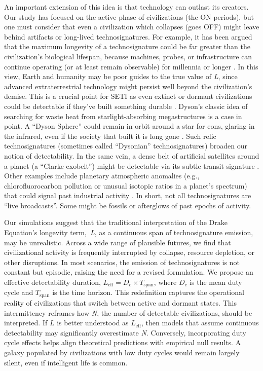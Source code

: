 An important extension of this idea is that technology can outlast its creators. Our study has focused on the active phase of civilizations (the ON periods), but one must consider that even a civilization which collapses (goes OFF) might leave behind artifacts or long-lived technosignatures. For example, it has been argued that the maximum longevity of a technosignature could be far greater than the civilization's biological lifespan, because machines, probes, or infrastructure can continue operating (or at least remain observable) for millennia or longer \citep{Wright2022-wh}. In this view, Earth and humanity may be poor guides to the true value of \emph{L}, since advanced extraterrestrial technology might persist well beyond the civilization's demise. This is a crucial point for SETI as even extinct or dormant civilizations could be detectable if they've built something durable \citep{Cirkovic2019-oq}. Dyson's classic idea of searching for waste heat from starlight-absorbing megastructures is a case in point. A ``Dyson Sphere'' could remain in orbit around a star for eons, glaring in the infrared, even if the society that built it is long gone \citep{Dyson1960-jf}. Such relic technosignatures (sometimes called ``Dysonian'' technosignatures) broaden our notion of detectability. In the same vein, a dense belt of artificial satellites around a planet (a ``Clarke exobelt'') might be detectable via its subtle transit signature \citep{Socas-Navarro2018-kg}. Other examples include planetary atmospheric anomalies (e.g., chlorofluorocarbon pollution or unusual isotopic ratios in a planet's spectrum) that could signal past industrial activity \citep{Wright2022-wh}. In short, not all technosignatures are ``live broadcasts''. Some might be fossils or afterglows of past epochs of activity.

Our simulations suggest that the traditional interpretation of the Drake Equation's longevity term,\, \emph{L}, as a continuous span of technosignature emission, may be unrealistic. Across a wide range of plausible futures, we find that civilizational activity is frequently interrupted by collapse, resource depletion, or other disruptions. In most scenarios, the emission of technosignatures is not constant but episodic, raising the need for a revised formulation. We propose an effective detectability duration, $L_{\mathrm{eff}} = D_c \times T_{\mathrm{span}}$, where $D_c$ is the mean duty cycle and $T_{\mathrm{span}}$ is the time horizon. This redefinition captures the operational reality of civilizations that switch between active and dormant states. This intermittency reframes how \emph{N}, the number of detectable civilizations, should be interpreted. If $L$ is better understood as $L_{\mathrm{eff}}$, then models that assume continuous detectability may significantly overestimate \emph{N}. Conversely, incorporating duty cycle effects helps align theoretical predictions with empirical null results. A galaxy populated by civilizations with low duty cycles would remain largely silent, even if intelligent life is common.

